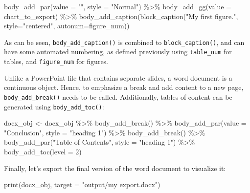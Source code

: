\documentclass[
]{krantz}
\makeatletter
\newenvironment{Shaded}{\begin{snugshade}}{\end{snugshade}}
\newcommand{\AttributeTok}[1]{\textcolor[rgb]{0.61,0.61,0.61}{#1}}
\newcommand{\DecValTok}[1]{\textcolor[rgb]{0.06,0.06,0.06}{#1}}
\newcommand{\FunctionTok}[1]{\textcolor[rgb]{0,0,0}{#1}}
\newcommand{\NormalTok}[1]{#1}
\newcommand{\OtherTok}[1]{\textcolor[rgb]{0.37,0.37,0.37}{#1}}
\newcommand{\SpecialCharTok}[1]{\textcolor[rgb]{0,0,0}{#1}}
\newcommand{\StringTok}[1]{\textcolor[rgb]{0.5,0.5,0.5}{#1}}
\newenvironment{kframe}{%
\medskip{}
\setlength{\fboxsep}{.8em}
 \def\at@end@of@kframe{}%
 \ifinner\ifhmode%
  \def\at@end@of@kframe{\end{minipage}}%
  \begin{minipage}{\columnwidth}%
 \fi\fi%
 \def\FrameCommand##1{\hskip\@totalleftmargin \hskip-\fboxsep
 \colorbox{shadecolor}{##1}\hskip-\fboxsep
     \hskip-\linewidth \hskip-\@totalleftmargin \hskip\columnwidth}%
 \MakeFramed {\advance\hsize-\width
   \@totalleftmargin\z@ \linewidth\hsize
   \@setminipage}}%
 {\par\unskip\endMakeFramed%
 \at@end@of@kframe}
\renewenvironment{Shaded}{\begin{kframe}}{\end{kframe}}
\makeatother
\begin{document}
\begin{Shaded}
\begin{Highlighting}[]
  \FunctionTok{body\_add\_par}\NormalTok{(}\AttributeTok{value =} \StringTok{""}\NormalTok{, }\AttributeTok{style =} \StringTok{"Normal"}\NormalTok{) }\SpecialCharTok{\%\textgreater{}\%} 
  \FunctionTok{body\_add\_gg}\NormalTok{(}\AttributeTok{value =}\NormalTok{ chart\_to\_export) }\SpecialCharTok{\%\textgreater{}\%} 
  \FunctionTok{body\_add\_caption}\NormalTok{(}\FunctionTok{block\_caption}\NormalTok{(}\StringTok{"My first figure."}\NormalTok{, }\AttributeTok{style=}\StringTok{"centered"}\NormalTok{, }\AttributeTok{autonum=}\NormalTok{figure\_num))}
\end{Highlighting}
\end{Shaded}

As can be seen, \texttt{body\_add\_caption()} is combined to \texttt{block\_caption()}, and can have some automated numbering, as defined previously using \texttt{table\_num} for tables, and \texttt{figure\_num} for figures.

Unlike a PowerPoint file that contains separate slides, a word document is a continuous object. Hence, to emphasize a break and add content to a new page, \texttt{body\_add\_break()} needs to be called. Additionally, tables of content can be generated using \texttt{body\_add\_toc()}:

\begin{Shaded}
\begin{Highlighting}[]
\NormalTok{docx\_obj }\OtherTok{\textless{}{-}}\NormalTok{ docx\_obj }\SpecialCharTok{\%\textgreater{}\%} 
  \FunctionTok{body\_add\_break}\NormalTok{() }\SpecialCharTok{\%\textgreater{}\%} 
  \FunctionTok{body\_add\_par}\NormalTok{(}\AttributeTok{value =} \StringTok{"Conclusion"}\NormalTok{, }\AttributeTok{style =} \StringTok{"heading 1"}\NormalTok{) }\SpecialCharTok{\%\textgreater{}\%} 
  \FunctionTok{body\_add\_break}\NormalTok{() }\SpecialCharTok{\%\textgreater{}\%}
  \FunctionTok{body\_add\_par}\NormalTok{(}\StringTok{"Table of Contents"}\NormalTok{, }\AttributeTok{style =} \StringTok{"heading 1"}\NormalTok{) }\SpecialCharTok{\%\textgreater{}\%} 
  \FunctionTok{body\_add\_toc}\NormalTok{(}\AttributeTok{level =} \DecValTok{2}\NormalTok{)}
\end{Highlighting}
\end{Shaded}

Finally, let's export the final version of the word document to visualize it:

\begin{Shaded}
\begin{Highlighting}[]
\FunctionTok{print}\NormalTok{(docx\_obj, }\AttributeTok{target =} \StringTok{"output/my export.docx"}\NormalTok{)}
\end{Highlighting}
\end{Shaded}
\end{document}
